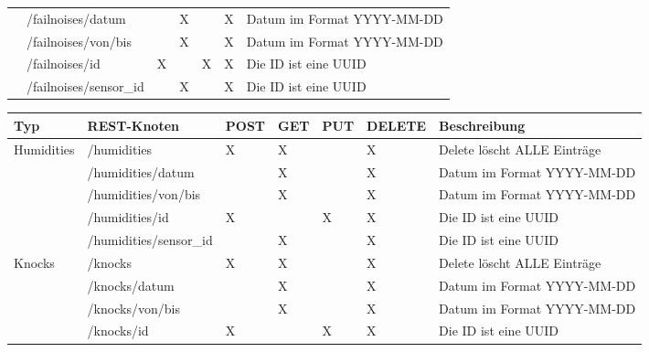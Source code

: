\begin{landscape}
\begin{table}[H]
\begin{longtable}{lllllll}
                                      & /failnoises/{datum}           &  & X & & X & Datum im Format YYYY-MM-DD     \\
                                      & /failnoises/{von}/{bis}       &  & X & & X & Datum im Format YYYY-MM-DD     \\
                                      & /failnoises/{id}              & X & & X & X & Die ID ist eine UUID          \\
                                      & /failnoises/{sensor\_id}      &  & X & & X & Die ID ist eine UUID           \\ \midrule
    \end{longtable}
  \end{table}

  \newpage

  \begin{table}[H]
    \begin{longtable}{lllllll}
      \textbf{Typ} & \textbf{REST-Knoten} & \textbf{POST} & \textbf{GET} & \textbf{PUT} & \textbf{DELETE} & \textbf{Beschreibung} \\ \toprule
      \multirow{5}{*}{Humidities}     & /humidities                   & X & X & & X & Delete löscht ALLE Einträge   \\
                                      & /humidities/{datum}           &  & X & & X & Datum im Format YYYY-MM-DD     \\
                                      & /humidities/{von}/{bis}       &  & X & & X & Datum im Format YYYY-MM-DD     \\
                                      & /humidities/{id}              & X & & X & X & Die ID ist eine UUID          \\
                                      & /humidities/{sensor\_id}      &  & X & & X & Die ID ist eine UUID           \\ \midrule
      \multirow{5}{*}{Knocks}         & /knocks                       & X & X & & X & Delete löscht ALLE Einträge   \\
                                      & /knocks/{datum}               &  & X & & X & Datum im Format YYYY-MM-DD     \\
                                      & /knocks/{von}/{bis}           &  & X & & X & Datum im Format YYYY-MM-DD     \\
                                      & /knocks/{id}                  & X & & X & X & Die ID ist eine UUID          \\

\end{longtable}
\end{table}
\end{landscape}
